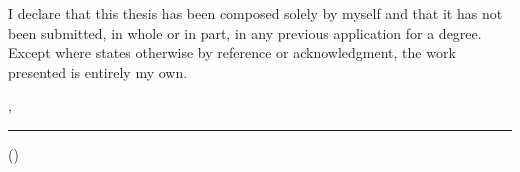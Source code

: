 \thispagestyle{empty}
\vspace*{0.68\textheight}
\noindent
I declare that this thesis has been composed solely by myself and that it has not been submitted, in whole or in part, in any previous application for a degree. Except where states otherwise by reference or acknowledgment, the work presented is entirely my own.

\vspace{13mm}
\noindent
\getSubmissionLocation{}, \getSubmissionDate{} 

\vspace{10mm}
\noindent
\rule{6cm}{0.4pt}

\noindent
(\getAuthor{})

\cleardoublepage{}
